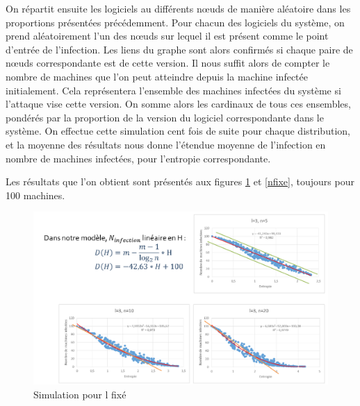 On répartit ensuite les logiciels au différents nœuds de manière aléatoire dans les proportions présentées précédemment.
Pour chacun des logiciels du système, on prend aléatoirement l'un des nœuds sur lequel il est présent comme le point d'entrée de l'infection. Les liens du graphe sont alors confirmés si chaque paire de nœuds correspondante est de cette version. Il nous suffit alors de compter le nombre de machines que l'on peut atteindre depuis la machine infectée initialement. Cela représentera l'ensemble des machines infectées du système si l'attaque vise cette version.
On somme alors les cardinaux de tous ces ensembles, pondérés par la proportion de la version du logiciel correspondante dans le système.
On effectue cette simulation cent fois de suite pour chaque distribution, et la moyenne des résultats nous donne l'étendue moyenne de l'infection en nombre de machines infectées, pour l'entropie correspondante.

Les résultats que l'on obtient sont présentés aux figures \ref{lfixe} et \ref{nfixe}, toujours pour 100 machines.

\begin{figure}[!ht]
\centering
     \includegraphics[width=1.0\linewidth]{Paul/python/lfixe.png}
     \caption{Simulation pour l fixé}
     \label{lfixe}
\end{figure}

